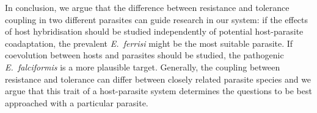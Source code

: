 In conclusion, we argue that the difference between resistance and tolerance coupling in two different parasites can guide research in our system: if the effects of host hybridisation should be studied independently of potential host-parasite coadaptation, the prevalent \textit{E.~ferrisi} might be the most suitable parasite. If coevolution between hosts and parasites should be studied, the pathogenic \textit{E.~falciformis} is a more plausible target. Generally, the coupling between resistance and tolerance can differ between closely related parasite species and we argue that this trait of a host-parasite system determines the questions to be best approached with a particular parasite. 
